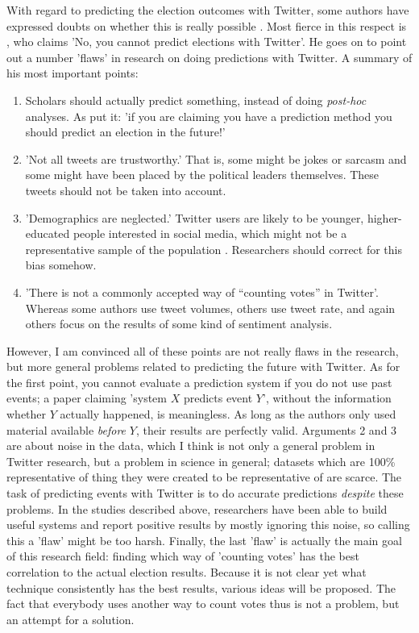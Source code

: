 \documentclass[12pt]{article}
\begin{document}
With regard to predicting the election outcomes with Twitter, some authors have expressed doubts on whether this is really possible . Most fierce in this respect is , who claims 'No, you cannot predict elections with Twitter'. He goes on to point out a number 'flaws' in research on doing predictions with Twitter. A summary of his most important points:

\begin{enumerate}
\item Scholars should actually predict something, instead of doing \emph{post-hoc} analyses. As  put it: 'if you are claiming you have a prediction method you should predict an election in the future!'
\item 'Not all tweets are trustworthy.' That is, some might be jokes or sarcasm and some might have been placed by the political leaders themselves. These tweets should not be taken into account.
\item 'Demographics are neglected.' Twitter users are likely to be younger, higher-educated people interested in social media, which might not be a representative sample of the population . Researchers should correct for this bias somehow.
\item 'There is not a commonly accepted way of “counting votes” in Twitter'. Whereas some authors use tweet volumes, others use tweet rate, and again others focus on the results of some kind of sentiment analysis.
\end{enumerate}

However, I am convinced all of these points are not really flaws in the research, but more general problems related to predicting the future with Twitter. As for the first point, you cannot evaluate a prediction system if you do not use past events; a paper claiming 'system $X$ predicts event $Y$', without the information whether $Y$ actually happened, is meaningless. As long as the authors only used material available \emph{before} $Y$, their results are perfectly valid. Arguments 2 and 3 are about noise in the data, which I think is not only a general problem in Twitter research, but a problem in science in general; datasets which are 100\% representative of thing they were created to be representative of are scarce. The task of predicting events with Twitter is to do accurate predictions \emph{despite} these problems. In the studies described above, researchers have been able to build useful systems and report positive results by mostly ignoring this noise, so calling this a 'flaw' might be too harsh. Finally, the last 'flaw' is actually the main goal of this research field: finding which way of 'counting votes' has the best correlation to the actual election results. Because it is not clear yet what technique consistently has the best results, various ideas will be proposed. The fact that everybody uses another way to count votes thus is not a problem, but an attempt for a solution.
\end{document}
